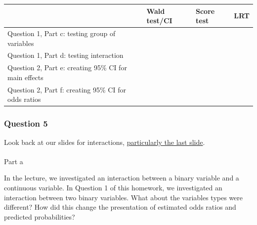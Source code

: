 \documentclass[
  letterpaper,
  DIV=11,
  numbers=noendperiod]{scrartcl}
\makeatletter
\let\oldparagraph\paragraph
\renewcommand{\paragraph}{
    \@ifstar
      \xxxParagraphStar
      \xxxParagraphNoStar
  }
\newcommand{\xxxParagraphStar}[1]{\oldparagraph*{#1}\mbox{}}
\newcommand{\xxxParagraphNoStar}[1]{\oldparagraph{#1}\mbox{}}
\makeatother
\begin{document}
\begin{longtable}[]{@{}
  >{\raggedright\arraybackslash}p{}
  >{\raggedright\arraybackslash}p{}
  >{\raggedright\arraybackslash}p{}
  >{\raggedright\arraybackslash}p{}@{}}
\toprule\noalign{}
\begin{minipage}[b]{\linewidth}\raggedright
\end{minipage} & \begin{minipage}[b]{\linewidth}\raggedright
Wald test/CI
\end{minipage} & \begin{minipage}[b]{\linewidth}\raggedright
Score test
\end{minipage} & \begin{minipage}[b]{\linewidth}\raggedright
LRT
\end{minipage} \\
\midrule\noalign{}
\endhead
\bottomrule\noalign{}
\endlastfoot
Question 1, Part c: testing group of variables & & & \\
Question 1, Part d: testing interaction & & & \\
Question 2, Part e: creating 95\% CI for main effects & & & \\
Question 2, Part f: creating 95\% CI for odds ratios & & & \\
\end{longtable}

\subsubsection{Question 5}\label{question-5}

Look back at our slides for interactions,
\href{https://nwakim.github.io/BSTA_513_S25/lessons/10_Interactions/10_Interactions.html\#/how-would-i-report-these-results}{particularly
the last slide}.

\paragraph{Part a}\label{part-a-3}

In the lecture, we investigated an interaction between a binary variable
and a continuous variable. In Question 1 of this homework, we
investigated an interaction between two binary variables. What about the
variables types were different? How did this change the presentation of
estimated odds ratios and predicted probabilities?
\end{document}
